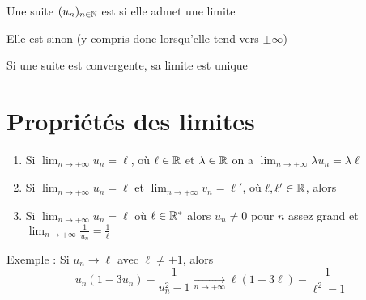 \begin{frame}
\begin{mydefinition}
Une suite $(u_n)_{n\in \mathbb{N}}$ est  si elle admet une limite 

Elle est  sinon (y compris donc lorsqu'elle tend vers $\pm \infty$)
\end{mydefinition}

\pause
\bigskip

\begin{proposition}
  Si une suite est convergente, sa limite est unique
\end{proposition}

\end{frame}


\section{Propriétés des limites}

\begin{frame}

\begin{proposition}
\label{prop:suitelimite}
\begin{enumerate}
\setlength{\itemsep}{9pt} 
 \item Si $\displaystyle \lim_{n\to +\infty}u_n=\ell$, où $\ell\in \mathbb{R}$ et $\lambda \in \mathbb{R}$ 
 on a $\displaystyle \lim_{n\to +\infty}\lambda u_n=\lambda \ell$
 
 \pause
 
  \item Si $\displaystyle \lim_{n\to +\infty}u_n=\ell$ et $\displaystyle \lim_{n\to +\infty}v_n=\ell'$, où $\ell,\ell'\in \mathbb{R}$, alors
    
\pause    
    
  \item Si $\displaystyle \lim_{n\to +\infty}u_n=\ell$ où $\ell\in \mathbb{R}^*$ 
alors $u_n\neq 0 $ pour $n$ assez grand et \\
\hfil \hfil $\displaystyle \lim_{n\to +\infty}\frac{1}{u_n}=\frac{1}{\ell}$
\end{enumerate}
\end{proposition}

\medskip
\pause

Exemple : Si $u_n \to \ell$ avec $\ell \neq \pm 1$, alors 
\vspace*{-2ex}
$$u_n(1-3u_n)-\frac{1}{u_n^2-1} \xrightarrow[n\to +\infty]{} \ell(1-3\ell) - \frac{1}{\ell^2-1}$$

\end{frame}


